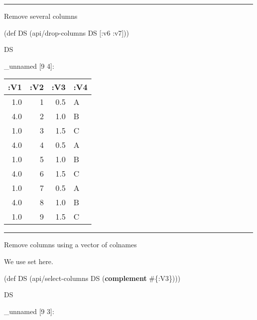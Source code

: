\documentclass[]{article}
\newenvironment{Shaded}{\begin{snugshade}}{\end{snugshade}}
\newcommand{\KeywordTok}[1]{\textcolor[rgb]{0.13,0.29,0.53}{\textbf{#1}}}
\newcommand{\FunctionTok}[1]{\textcolor[rgb]{0.00,0.00,0.00}{#1}}
\newcommand{\BuiltInTok}[1]{#1}
\newcommand{\AttributeTok}[1]{\textcolor[rgb]{0.77,0.63,0.00}{#1}}
\newcommand{\NormalTok}[1]{#1}
\begin{document}
\begin{center}\rule{0.5\linewidth}{0.5pt}\end{center}

Remove several columns

\begin{Shaded}
\begin{Highlighting}[]
\NormalTok{(}\BuiltInTok{def}\FunctionTok{ DS }\NormalTok{(api/drop-columns DS [}\AttributeTok{:v6} \AttributeTok{:v7}\NormalTok{]))}
\end{Highlighting}
\end{Shaded}

\begin{Shaded}
\begin{Highlighting}[]
\NormalTok{DS}
\end{Highlighting}
\end{Shaded}

\_unnamed {[}9 4{]}:

\begin{longtable}[]{@{}rrrl@{}}
\toprule
:V1 & :V2 & :V3 & :V4\tabularnewline
\midrule
\endhead
1.0 & 1 & 0.5 & A\tabularnewline
4.0 & 2 & 1.0 & B\tabularnewline
1.0 & 3 & 1.5 & C\tabularnewline
4.0 & 4 & 0.5 & A\tabularnewline
1.0 & 5 & 1.0 & B\tabularnewline
4.0 & 6 & 1.5 & C\tabularnewline
1.0 & 7 & 0.5 & A\tabularnewline
4.0 & 8 & 1.0 & B\tabularnewline
1.0 & 9 & 1.5 & C\tabularnewline
\bottomrule
\end{longtable}

\begin{center}\rule{0.5\linewidth}{0.5pt}\end{center}

Remove columns using a vector of colnames

We use set here.

\begin{Shaded}
\begin{Highlighting}[]
\NormalTok{(}\BuiltInTok{def}\FunctionTok{ DS }\NormalTok{(api/select-columns DS (}\KeywordTok{complement}\NormalTok{ #\{}\AttributeTok{:V3}\NormalTok{\})))}
\end{Highlighting}
\end{Shaded}

\begin{Shaded}
\begin{Highlighting}[]
\NormalTok{DS}
\end{Highlighting}
\end{Shaded}

\_unnamed {[}9 3{]}:
\end{document}
